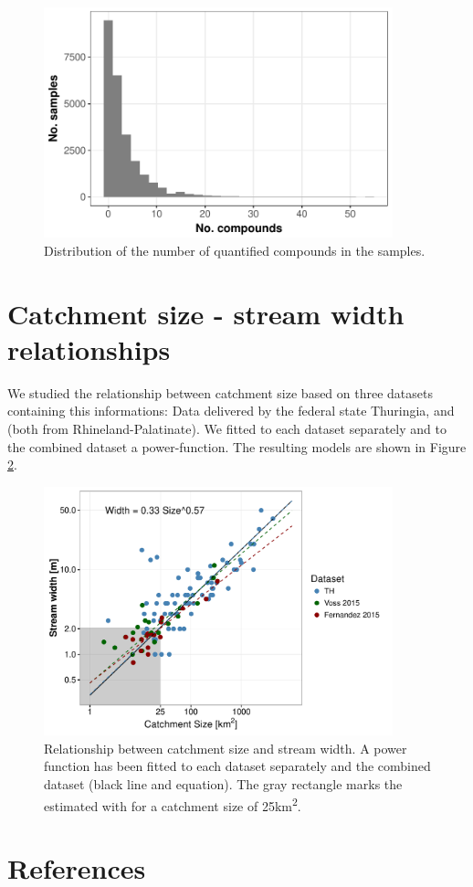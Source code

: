 \begin{figure}[ht]
	\centering
	\includegraphics[width = 0.9\textwidth]{appendix/smallstreams/one/pmix}
	\caption{Distribution of the number of quantified compounds in the samples.}
	\label{fig:pmix}
\end{figure}


\clearpage
\section{Catchment size - stream width relationships}
We studied the relationship between catchment size based on three datasets containing this informations:
Data delivered by the federal state Thuringia, \citet{vos_organic_2015} and \citet{fernandez_effects_2015} (both from Rhineland-Palatinate).
We fitted to each dataset separately and to the combined dataset a power-function.
The resulting models are shown in Figure \ref{fig:size_width}. 

\begin{figure}[ht]
	\centering
	\includegraphics[width = 0.9\textwidth]{appendix/smallstreams/one/width_size}
		\caption[Relationship between catchment size and stream width.]{Relationship between catchment size and stream width. A power function has been fitted to each dataset separately and the combined dataset (black line and equation). The gray rectangle marks the estimated with for a catchment size of 25km\textsuperscript{2}.}
	\label{fig:size_width}
\end{figure}

\clearpage
\section{References}
\printbibliography[heading=none]
